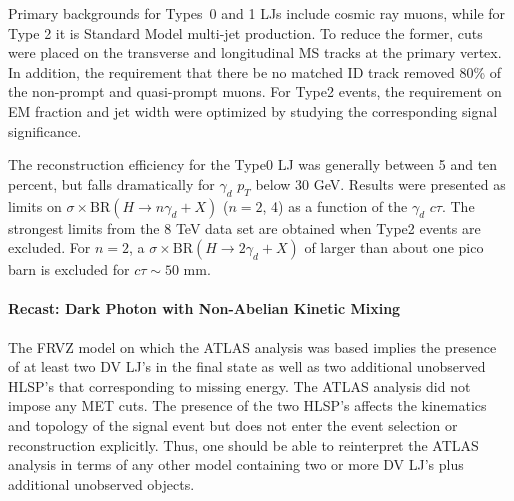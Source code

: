 Primary backgrounds for Types~0 and 1 LJs include cosmic ray muons, while for Type 2 it is Standard Model multi-jet production. To reduce the former, cuts were placed on the transverse and longitudinal MS tracks at the primary vertex. In addition, the requirement that there be no matched ID track removed 80\% of the non-prompt and quasi-prompt muons. For Type2 events, the requirement on EM fraction and jet width were optimized by studying the corresponding signal significance. 

The reconstruction efficiency for the Type0 LJ was generally between 5 and ten percent, but falls dramatically for $\gamma_d$ $p_T$ below 30 GeV. 
%
Results were presented as limits on $\sigma\times \mathrm{BR}(H\to n\gamma_d+X)$ ($n=2$, 4) as a function of the $\gamma_d$ $c\tau$. The strongest limits  from the 8 TeV data set are obtained when Type2 events are excluded. For $n=2$, a $\sigma\times \mathrm{BR}(H\to 2\gamma_d+X)$ of larger than about one pico barn is excluded for $c\tau\sim 50$ mm. 

\paragraph {Recast: Dark Photon with Non-Abelian Kinetic Mixing} The FRVZ model on which the ATLAS analysis was based implies the presence of at least two DV LJ's in the final state as well as two additional unobserved HLSP's that corresponding to missing energy. The ATLAS analysis did not impose any MET cuts. The presence of the two HLSP's affects the kinematics and topology of the signal event but does not enter the event selection or reconstruction explicitly. Thus, one should be able to reinterpret the ATLAS analysis in terms of any other model containing two or more DV LJ's plus additional unobserved objects. 

